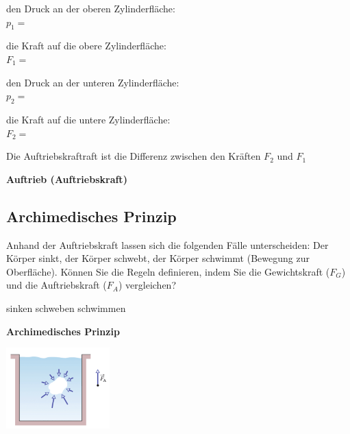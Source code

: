 \documentclass[11pt]{article}
\begin{document}
den Druck an der oberen Zylinderfläche: \\
$p_1 =$ \vspace{0.5cm} 

die Kraft auf die obere Zylinderfläche: \\
$F_1 = $ \vspace{0.5cm}

den Druck an der unteren Zylinderfläche: \\
$p_2 = $ \vspace{0.5cm}

die Kraft auf die untere Zylinderfläche: \\
$F_2 = $ \vspace{0.5cm}


Die Auftriebskraftraft ist die Differenz zwischen den Kräften $F_2$ und $F_1$ 
\vspace{3cm}


\begin{tcolorbox}[width=\textwidth, %
    colback=white,colframe=gray!75!black]
    \textbf{Auftrieb (Auftriebskraft)}
    \vspace{3cm}
\end{tcolorbox}

\newpage
\subsection*{Archimedisches Prinzip}

Anhand der Auftriebskraft lassen sich die folgenden Fälle unterscheiden: Der Körper sinkt, der Körper schwebt, der Körper schwimmt (Bewegung zur Oberfläche). Können Sie die Regeln definieren, indem Sie die Gewichtskraft ($F_G$) und die Auftriebskraft ($F_A$) vergleichen?

\hspace{1.5cm} sinken \hspace{4cm} schweben \hspace{4cm} schwimmen

\vspace{3cm}

\begin{tcolorbox}[width=\textwidth, %
    colback=white,colframe=gray!75!black]
    \textbf{Archimedisches Prinzip}
    \begin{flushright}
        \includegraphics[width=0.3\textwidth]{images/Archimedisches_Prinzip.png}
    \end{flushright}

    \vspace{1cm}
\end{tcolorbox}
\end{document}
